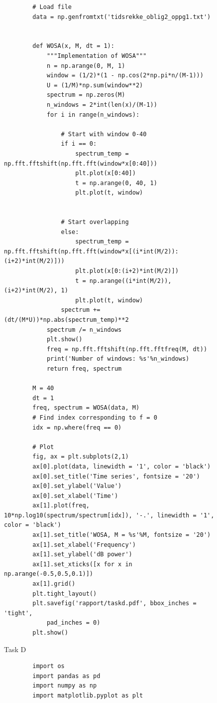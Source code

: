 {\begin{figure}[H]
\begin{lstlisting}
        # Load file
        data = np.genfromtxt('tidsrekke_oblig2_oppg1.txt')
        
        
        def WOSA(x, M, dt = 1):
            """Implementation of WOSA"""
            n = np.arange(0, M, 1)
            window = (1/2)*(1 - np.cos(2*np.pi*n/(M-1)))
            U = (1/M)*np.sum(window**2)
            spectrum = np.zeros(M)
            n_windows = 2*int(len(x)/(M-1))
            for i in range(n_windows):
        
                # Start with window 0-40
                if i == 0:
                    spectrum_temp = np.fft.fftshift(np.fft.fft(window*x[0:40]))
                    plt.plot(x[0:40])
                    t = np.arange(0, 40, 1)
                    plt.plot(t, window)
        
        
                # Start overlapping
                else:
                    spectrum_temp = np.fft.fftshift(np.fft.fft(window*x[(i*int(M/2)):(i+2)*int(M/2)]))
                    plt.plot(x[0:(i+2)*int(M/2)])
                    t = np.arange((i*int(M/2)), (i+2)*int(M/2), 1)
                    plt.plot(t, window)
                spectrum += (dt/(M*U))*np.abs(spectrum_temp)**2        
            spectrum /= n_windows
            plt.show()
            freq = np.fft.fftshift(np.fft.fftfreq(M, dt))
            print('Number of windows: %s'%n_windows)
            return freq, spectrum
        
        M = 40
        dt = 1
        freq, spectrum = WOSA(data, M)
        # Find index corresponding to f = 0 
        idx = np.where(freq == 0)
        
        # Plot
        fig, ax = plt.subplots(2,1)
        ax[0].plot(data, linewidth = '1', color = 'black')
        ax[0].set_title('Time series', fontsize = '20')
        ax[0].set_ylabel('Value')
        ax[0].set_xlabel('Time')
        ax[1].plot(freq, 10*np.log10(spectrum/spectrum[idx]), '-.', linewidth = '1', color = 'black')
        ax[1].set_title('WOSA, M = %s'%M, fontsize = '20')
        ax[1].set_xlabel('Frequency')
        ax[1].set_ylabel('dB power')
        ax[1].set_xticks([x for x in np.arange(-0.5,0.5,0.1)])
        ax[1].grid()
        plt.tight_layout()
        plt.savefig('rapport/taskd.pdf', bbox_inches = 'tight',
            pad_inches = 0)
        plt.show() 
    \end{lstlisting}
\caption{Task D}
\label{TaskDcode}
\end{figure}



\begin{figure}[H]
    \begin{lstlisting}
        import os
        import pandas as pd
        import numpy as np 
        import matplotlib.pyplot as plt
        

\end{lstlisting}
\end{figure}}
